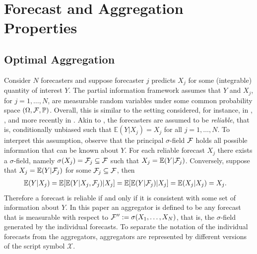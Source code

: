 \documentclass[11pt]{article}
\renewcommand{\P}{\mathbb{P}}
\newcommand{\E}{\mathbb{E}}
\theoremstyle{definition}
\theoremstyle{definition}
\def\F{{\cal F}}
\def\P{{\mathbb P}}
\def\E{{\mathbb E}}
\begin{document}

\section{Forecast and Aggregation Properties} \label{propertiesS}
\subsection{Optimal Aggregation}


Consider $N$ forecasters and suppose forecaster $j$ predicts $X_j$ for some (integrable) quantity of interest $Y$.  The partial information framework assumes that $Y$ and $X_j$, for $j = 1, \dots, N$, are measurable  random variables under some common probability space $(\Omega, \F , \P)$. Overall, this is similar to the setting considered, for instance, in \cite{degroot1981assessing}, \cite{murphy1987general}, and more recently in \cite{Ranjan08}. Akin to  \cite{Ranjan08}, the forecasters are assumed to be \textit{reliable}, that is, conditionally unbiased such that $\E(Y | X_j) = X_j$ for all $j = 1, \dots, N$.  To interpret this assumption, observe that the principal $\sigma$-field $\F$ holds all possible information that can be known about $Y$. For each reliable forecast $X_j$ there exists a $\sigma$-field, namely $\sigma(X_j) = \F_j \subseteq \F$ such that $X_j = \E(Y|\F_j)$. Conversely, suppose that $X_j = \E(Y|\F_j)$ for some $\F_j \subseteq \F$, then
\begin{align*}
\E(Y | X_j) &= \E[\E(Y|X_j,\F_j)|X_j] = \E[\E(Y|\F_j)|X_j] = \E(X_j|X_j) = X_j.
\end{align*}
Therefore a forecast is reliable if and only if it is consistent with some set of information about $Y$.
In this paper an aggregator is defined to be any forecast that is measurable with respect to $\F'' := \sigma(X_1, \dots, X_N)$, that is, the $\sigma$-field generated by the individual forecasts. To separate the notation of the individual forecasts from the aggregators, aggregators are represented by different versions of the script symbol $\mathcal{X}$. 
\end{document}
